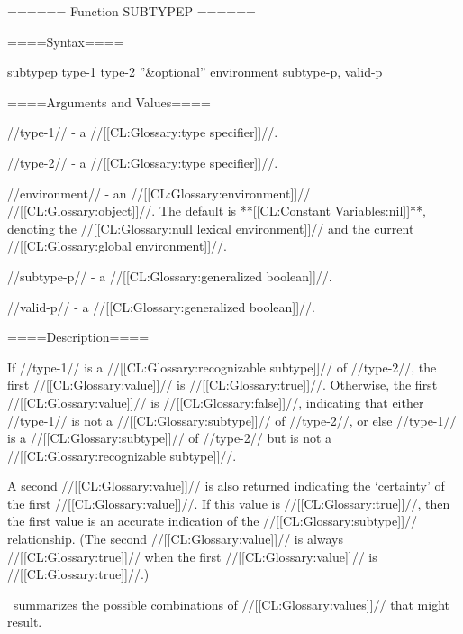 ====== Function SUBTYPEP ======

====Syntax====

\DefunWithValues subtypep {type-1 type-2 ''&optional'' environment} {subtype-p, valid-p}

====Arguments and Values====

//type-1// - a //[[CL:Glossary:type specifier]]//.

//type-2// - a //[[CL:Glossary:type specifier]]//.

//environment// - an //[[CL:Glossary:environment]]// //[[CL:Glossary:object]]//. The default is **[[CL:Constant Variables:nil]]**, denoting the //[[CL:Glossary:null lexical environment]]// and the current //[[CL:Glossary:global environment]]//.

//subtype-p// - a //[[CL:Glossary:generalized boolean]]//.

//valid-p// - a //[[CL:Glossary:generalized boolean]]//.

====Description====

If //type-1// is a //[[CL:Glossary:recognizable subtype]]// of //type-2//, the first //[[CL:Glossary:value]]// is //[[CL:Glossary:true]]//. Otherwise, the first //[[CL:Glossary:value]]// is //[[CL:Glossary:false]]//, indicating that either //type-1// is not a //[[CL:Glossary:subtype]]// of //type-2//, or else //type-1// is a //[[CL:Glossary:subtype]]// of //type-2// but is not a //[[CL:Glossary:recognizable subtype]]//.

A second //[[CL:Glossary:value]]// is also returned indicating the `certainty' of the first //[[CL:Glossary:value]]//. If this value is //[[CL:Glossary:true]]//, then the first value is an accurate indication of the //[[CL:Glossary:subtype]]// relationship. (The second //[[CL:Glossary:value]]// is always //[[CL:Glossary:true]]// when the first //[[CL:Glossary:value]]// is //[[CL:Glossary:true]]//.)

\Thenextfigure\ summarizes the possible combinations of //[[CL:Glossary:values]]// that might result.


